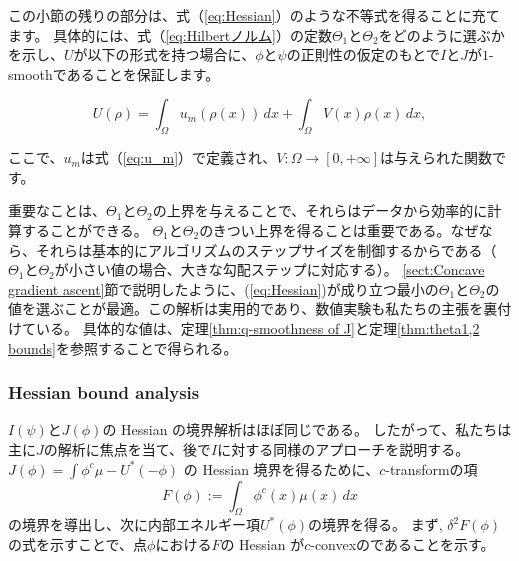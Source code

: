 \documentclass{jsarticle}
\theoremstyle{definition}
\begin{document}
この小節の残りの部分は、式（\ref{eq:Hessian}）のような不等式を得ることに充てます。
具体的には、式（\ref{eq:Hilbertノルム}）の定数$\Theta_1$と$\Theta_2$をどのように選ぶかを示し、$U$が以下の形式を持つ場合に、$\phi$と$\psi$の正則性の仮定のもとで$I$と$J$が$1$-smoothであることを保証します。

\begin{equation}
    \label{eq:U}
    U(\rho) = \int_\Omega u_m(\rho(x)) \, dx + \int_\Omega V(x) \rho(x) \, dx,
\end{equation}

ここで、$u_m$は式（\ref{eq:u_m}）で定義され、$V : \Omega \to [0, +\infty]$は与えられた関数です。

{\color{red}
重要なことは、$\Theta_1$と$\Theta_2$の上界を与えることで、それらはデータから効率的に計算することができる。
$\Theta_1$と$\Theta_2$のきつい上界を得ることは重要である。なぜなら、それらは基本的にアルゴリズムのステップサイズを制御するからである（$\Theta_1$と$\Theta_2$が小さい値の場合、大きな勾配ステップに対応する）。
\ref{sect:Concave gradient ascent}節で説明したように、(\ref{eq:Hessian})が成り立つ最小の$\Theta_1$と$\Theta_2$の値を選ぶことが最適。この解析は実用的であり、数値実験も私たちの主張を裏付けている。
具体的な値は、定理\ref{thm:q-smoothness of J}と定理\ref{thm:theta1,2 bounds}を参照することで得られる。
}

\subsubsection{Hessian bound analysis}

$I(\psi)$と$J(\phi)$の Hessian の境界解析はほぼ同じである。
したがって、私たちは主に$J$の解析に焦点を当て、後で$I$に対する同様のアプローチを説明する。
$J(\phi) = \int \phi^c\mu - U^*(- \phi)$ の Hessian 境界を得るために、$c$-transformの項 
\begin{equation}
    \label{def:F}
    F(\phi) := \int_\Omega \phi^c(x)\mu(x) \, dx
\end{equation}
の境界を導出し、次に内部エネルギー項$U^*(\phi)$の境界を得る。
まず, $\delta^2 F(\phi)$の式を示すことで、点$\phi$における$F$の Hessian が$c$-convexのであることを示す。
\end{document}
